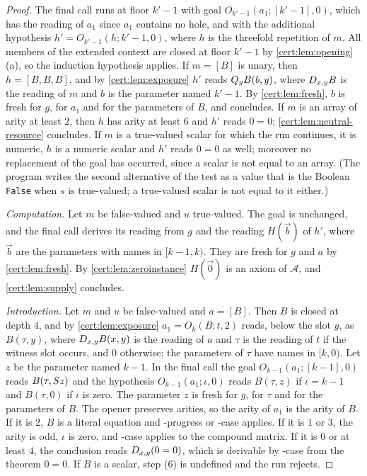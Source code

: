 \begin{proof}
The final call runs at floor $k'-1$ with goal $O_{k'-1}(a_1;[k'-1],0)$, which
has the reading of $a_1$ since $a_1$ contains no hole, and with the additional
hypothesis $h'=O_{k'-1}(h;k'-1,0)$, where $h$ is the threefold repetition of
$m$. All members of the extended context are closed at floor $k'-1$ by
\cref{cert:lem:opening}(a), so the induction hypothesis applies. If $m=[B]$ is
unary, then $h=[B,B,B]$, and by \cref{cert:lem:exposure} $h'$ reads
$Q_{y}B(b,y)$, where $D_{x,y}B$ is the reading of $m$ and $b$ is the
parameter named $k'-1$. By \cref{cert:lem:fresh}, $b$ is fresh for $g$, for
$a_1$ and for the parameters of $B$, and  concludes. If $m$ is
an array of arity at least $2$, then $h$ has arity at least $6$ and $h'$ reads
$0=0$; \cref{cert:lem:neutral-resource} concludes. If $m$ is a true-valued
scalar for which the run continues, it is numeric, $h$ is a numeric scalar and
$h'$ reads $0=0$ as well; moreover no replacement of the goal has occurred,
since a scalar is not equal to an array. (The program writes the second
alternative of the test as a value that is the Boolean \texttt{False} when $s$
is true-valued; a true-valued scalar is not equal to it either.)

\emph{Computation.} Let $m$ be false-valued and $u$ true-valued. The goal is
unchanged, and the final call derives its reading from $g$ and the reading
$H(\vec b)$ of $h'$, where $\vec b$ are the parameters with names in
$[k-1,k)$. They are fresh for $g$ and $a$ by \cref{cert:lem:fresh}. By
\cref{cert:lem:zeroinstance} $H(\vec 0)$ is an axiom of $\mathcal A$, and
\cref{cert:lem:supply} concludes.

\emph{Introduction.} Let $m$ and $u$ be false-valued and $a=[B]$. Then $B$ is
closed at depth $4$, and by \cref{cert:lem:exposure} $a_1=O_k(B;t,2)$ reads,
below the slot $y$, as $B(\tau,y)$, where $D_{x,y}B(x,y)$ is the reading of
$a$ and $\tau$ is the reading of $t$ if the witness slot occurs, and $0$
otherwise; the parameters of $\tau$ have names in $[k,0)$. Let $z$ be the
parameter named $k-1$. In the final call the goal $O_{k-1}(a_1;[k-1],0)$ reads
$B(\tau,S z)$ and the hypothesis $O_{k-1}(a_1;\iota,0)$ reads $B(\tau,z)$
if $\iota=k-1$ and $B(\tau,0)$ if $\iota$ is zero. The parameter $z$ is fresh
for $g$, for $\tau$ and for the parameters of $B$. The opener preserves
arities, so the arity of $a_1$ is the arity of $B$. If it is $2$, $B$ is a
literal equation and -progress or -case applies. If
it is $1$ or $3$, the arity is odd, $\iota$ is zero, and -case
applies to the compound matrix. If it is $0$ or at least $4$, the conclusion
reads $D_{x,y}(0=0)$, which is derivable by -case from the
theorem $0=0$. If $B$ is a scalar, step (6) is undefined and the run rejects.
\end{proof}

